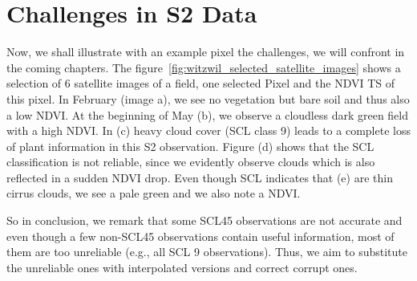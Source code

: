 		
\section{Challenges in S2 Data}{\label{sec:s2_challangges}
	
	Now, we shall illustrate with an example pixel the challenges, we will confront in the coming chapters. The figure~\ref{fig:witzwil_selected_satellite_images} shows a selection of 6 satellite images of a field, one selected Pixel and the NDVI {TS} of this pixel. 		
	In February (image a), we see no vegetation but bare soil and thus also a low NDVI. At the beginning of May (b), we observe a cloudless dark green field with a high NDVI. In (c) heavy cloud cover (SCL class 9) leads to a complete loss of plant information in this S2 observation. Figure (d) shows that the SCL classification is not reliable, since we evidently observe clouds which is also reflected in a sudden NDVI drop. Even though SCL indicates that (e) are thin cirrus clouds, we see a pale green and we also note a NDVI.

	So in conclusion, we remark that some SCL45 observations are not accurate and even though a few non-SCL45 observations contain useful information, most of them are too unreliable (e.g., all SCL 9 observations). Thus, we aim to substitute the unreliable ones with interpolated versions and correct corrupt ones.
		
}

